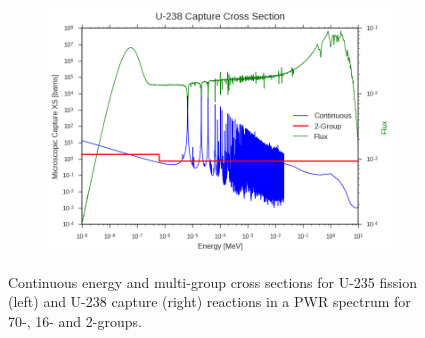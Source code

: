 \begin{figure}
\begin{subfigure}{.5\textwidth}
  \includegraphics[width=\linewidth]{figures/intro/u238-capture-2}
  \caption{}
\end{subfigure}
\caption[Uranium-235 and Uranium-238 cross sections]{Continuous energy and multi-group cross sections for U-235 fission (left) and U-238 capture (right) reactions in a PWR spectrum for 70-, 16- and 2-groups.}
\label{fig:pwr-ce-mg-xs}
\end{figure}
